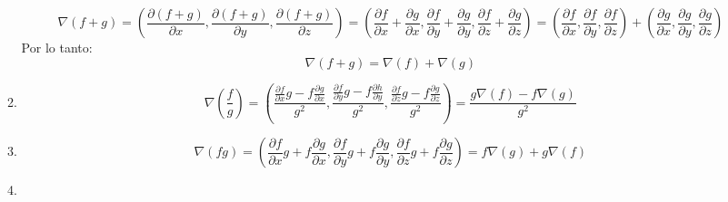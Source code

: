 \begin{enumerate}[label=\color{red}\textbf{\arabic*)}]
\begin{enumerate}[label=\color{red}\textbf{\alph*)}]
      \[
      \nabla (f+g)=\left( \frac{\partial (f+g)}{\partial x},\frac{\partial (f+g)}{\partial y} ,\frac{\partial (f+g)}{\partial z}  \right) =\left( \frac{\partial f}{\partial x} +\frac{\partial g}{\partial x} ,\frac{\partial f}{\partial y} +\frac{\partial g}{\partial y},\frac{\partial f}{\partial z}+\frac{\partial g}{\partial z}   \right) =\left( \frac{\partial f}{\partial x} ,\frac{\partial f}{\partial y} ,\frac{\partial f}{\partial z}  \right) +\left( \frac{\partial g}{\partial x} ,\frac{\partial g}{\partial y} ,\frac{\partial g}{\partial z}  \right)
    \]
    Por lo tanto: \[
    \nabla (f+g) =\nabla (f)+\nabla (g)
    \] 
    \item {}
    \[
    \nabla \left( \dfrac{f}{g} \right) =\left( \dfrac{\frac{\partial f}{\partial x} g-f \frac{\partial g}{\partial x} }{g^2},\dfrac{\frac{\partial f}{\partial y} g-f \frac{\partial h}{\partial y} }{g^2},\dfrac{\frac{\partial f}{\partial z} g-f \frac{\partial g}{\partial z} }{g^2}   \right) =\dfrac{g\nabla (f)-f\nabla (g)}{g^2} 
    \] 
    \item {}
      
      \[
      \nabla (fg)=\left( \frac{\partial f}{\partial x} g+f \frac{\partial g}{\partial x} ,\frac{\partial f}{\partial y} g+f \frac{\partial g}{\partial y} ,\frac{\partial f}{\partial z} g+f \frac{\partial g}{\partial z}  \right) =f\nabla (g)+g\nabla (f)
      \] 
    \item {} 


\end{enumerate}
\end{enumerate}
